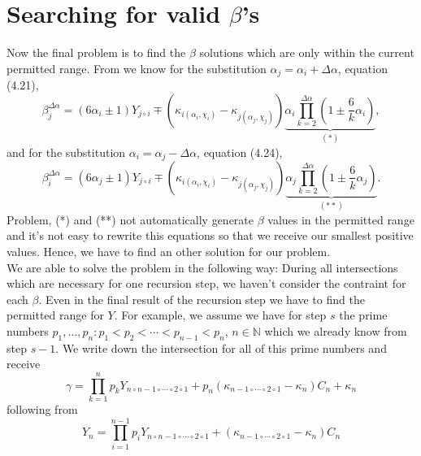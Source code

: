 \documentclass{amsart}
\begin{document}
\section{Searching for valid $\beta$'s}
\label{s:smallestbeta}
Now the final problem is to find the $\beta$ solutions which are only within the current permitted range. From \cite{CaZoeb} we know for the substitution $\alpha_{j} = \alpha_{i} + \Delta\alpha$, equation (4.21), 
\begin{equation}
	\beta_{j}^{\Delta\alpha} = \left(6\alpha_{i} \pm 1\right)Y_{j\circ i} \mp \left(\kappa_{i\left(\alpha_{i},\chi_{i}\right)} - \kappa_{j\left(\alpha_{j}, \chi_{j}\right)}\right)\underbrace{\alpha_{i}\prod_{k=2}^{\Delta\alpha}\left(1\pm\frac{6}{k}\alpha_{i}\right)}_{\left(*\right)},
\label{eq:subalphaj_sol}\end{equation}
and for the substitution $\alpha_{i} = \alpha_{j} - \Delta\alpha$, equation (4.24),
\begin{equation}
	\beta_{i}^{\Delta\alpha} = \left(6\alpha_{j} \pm 1\right)Y_{j\circ i} \mp \left(\kappa_{i\left(\alpha_{i},\chi_{i}\right)} - \kappa_{j\left(\alpha_{j},\chi_{j}\right)}\right)\underbrace{\alpha_{j}\prod_{k=2}^{\Delta\alpha}\left(1\pm\frac{6}{k}\alpha_{j}\right)}_{\left(**\right)}.
\label{eq:subalphai_sol}\end{equation}
Problem, (*) and (**) not automatically generate $\beta$ values in the permitted range and it's not easy to rewrite this equations so that we receive our smallest positive values. Hence, we have to find an other solution for our problem.\\
We are able to solve the problem in the following way: During all intersections which are necessary for one recursion step, we haven't consider the contraint for each $\beta$. Even in the final result of the recursion step we have to find the permitted range for $Y$. For example, we assume we have for step $s$ the prime numbers $p_{1}, \dots, p_{n}: p_{1} < p_{2} < \cdots < p_{n-1} < p_{n}$, $n \in \mathbb{N}$ which we already know from step $s-1$. We write down the intersection for all of this prime numbers and receive
\begin{equation}
	\gamma = \prod_{k=1}^{n}p_{k}Y_{n \circ n-1 \circ \cdots \circ 2 \circ 1} + p_{n}\left(\kappa_{n-1 \circ \cdots \circ 2 \circ 1} - \kappa_{n}\right)C_{n} + \kappa_{n}
\label{eq:smallest_beta_v1}\end{equation}
following from
\begin{equation}
	Y_{n} = \prod_{i=1}^{n-1}p_{i}Y_{n \circ n-1 \circ \cdots \circ 2 \circ 1} + \left(\kappa_{n-1 \circ \cdots \circ 2 \circ 1} - \kappa_{n}\right)C_{n}
\label{eq:smallest_beta_v1_beta}\end{equation}
\end{document}
